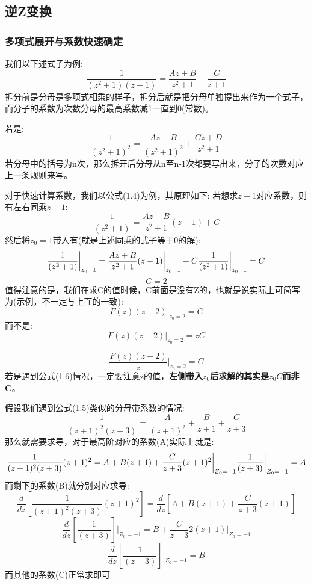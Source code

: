 \documentclass[12pt, a4paper, oneside]{ctexbook}
\begin{document}
\subsection{逆Z变换}
\subsubsection{多项式展开与系数快速确定}
我们以下述式子为例:
\begin{equation}
	\frac{1}{(z^2+1)(z+1)} = \frac{Az+B}{z^2+1}+\frac{C}{z+1}
\end{equation}
拆分前是分母是多项式相乘的样子，拆分后就是把分母单独提出来作为一个式子，而分子的系数为次数分母的最高系数减1一直到0(常数)。

若是:
\begin{equation}
	\frac{1}{(z^2+1)^2} = \frac{Az+B}{(z^2+1)^2}+\frac{Cz+D}{z^2+1}
\end{equation}
若分母中的括号为n次，那么拆开后分母从n至n-1次都要写出来，分子的次数对应上一条规则来写。

对于快速计算系数，我们以公式(1.4)为例，其原理如下:
若想求$z-1$对应系数，则有左右同乘$z-1$:
$$
\frac{1}{(z^2+1)} = \frac{Az+B}{z^2+1}(z-1)+C
$$
然后将$z_0=1$带入有(就是上述同乘的式子等于0的解):
$$
\frac{1}{(z^2+1)}\bigg|_{z_0=1} = \frac{Az+B}{z^2+1}(z-1)\bigg|_{z_0=1}+C\\
\frac{1}{(z^2+1)}\bigg|_{z_0=1}=C\\
$$
$$
C=2
$$
值得注意的是，我们在求C的值时候，C前面是没有Z的，也就是说实际上可简写为(示例，不一定与上面的一致):
$$
F(z)(z-2)\bigg|_{z_0=2}=C
$$
而不是:
\begin{equation}
	F(z)(z-2)\bigg|_{z_0=2}=zC
\end{equation}

$$
\frac{F(z)(z-2)}{z}\bigg|_{z_0=2}=C
$$
若是遇到公式(1.6)情况，一定要注意z的值，\textbf{左侧带入$z_0$后求解的其实是$z_0C$而非C}。

假设我们遇到公式(1.5)类似的分母带系数的情况:
$$
\frac{1}{(z+1)^2(z+3)} = \frac{A}{(z+1)^2}+\frac{B}{z+1}+\frac{C}{z+3}
$$
那么就需要求导，对于最高阶对应的系数(A)实际上就是:
$$
\frac{1}{(z+1)^2(z+3)}(z+1)^2= A+B(z+1)+\frac{C}{z+3}(z+1)^2\bigg|_{Z_0=-1}\\
\frac{1}{(z+3)}\bigg|_{Z_0=-1}= A
$$
而剩下的系数(B)就分别对应求导:
$$
\frac{d}{dz}[\frac{1}{(z+1)^2(z+3)}(z+1)^2]= \frac{d}{dz}[A+B(z+1)+\frac{C}{z+3}(z+1)]
$$
$$
\frac{d}{dz}[\frac{1}{(z+3)}]\bigg|_{Z_0=-1}= B+\frac{C}{z+3}2(z+1)\bigg|_{Z_0=-1}
$$
$$
\frac{d}{dz}[\frac{1}{(z+3)}]\bigg|_{Z_0=-1}= B
$$
而其他的系数(C)正常求即可
\end{document}
